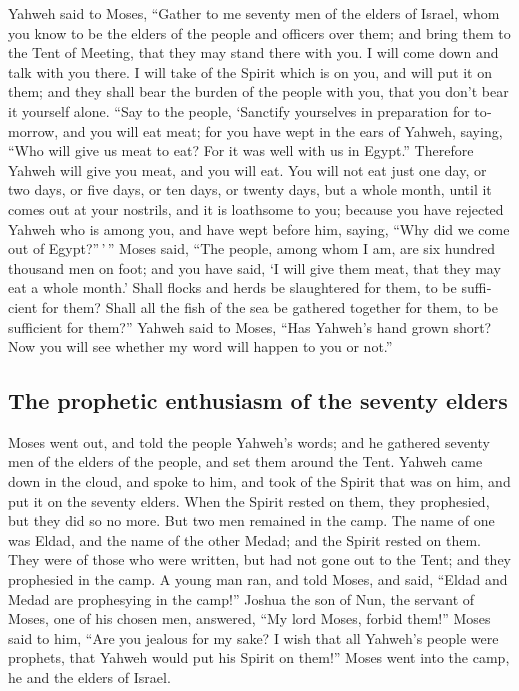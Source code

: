 \begin{paracol}{2}
\begin{otherlanguage}{english}
 Yahweh said to Moses, ``Gather to me seventy men of the
elders of Israel, whom you know to be the elders of the people and
officers over them; and bring them to the Tent of Meeting, that they may
stand there with you.  I will come down and talk with you
there. I will take of the Spirit which is on you, and will put it on
them; and they shall bear the burden of the people with you, that you
don't bear it yourself alone.  ``Say to the people,
`Sanctify yourselves in preparation for tomorrow, and you will eat meat;
for you have wept in the ears of Yahweh, saying, ``Who will give us meat
to eat? For it was well with us in Egypt.'' Therefore Yahweh will give
you meat, and you will eat.  You will not eat just one
day, or two days, or five days, or ten days, or twenty days,
 but a whole month, until it comes out at your nostrils,
and it is loathsome to you; because you have rejected Yahweh who is
among you, and have wept before him, saying, ``Why did we come out of
Egypt?''\,'\,''  Moses said, ``The people, among whom I
am, are six hundred thousand men on foot; and you have said, `I will
give them meat, that they may eat a whole month.'  Shall
flocks and herds be slaughtered for them, to be sufficient for them?
Shall all the fish of the sea be gathered together for them, to be
sufficient for them?''  Yahweh said to Moses, ``Has
Yahweh's hand grown short? Now you will see whether my word will happen
to you or not.''

\hypertarget{the-prophetic-enthusiasm-of-the-seventy-elders}{%
\subsection{The prophetic enthusiasm of the seventy
elders}\label{the-prophetic-enthusiasm-of-the-seventy-elders}}

 Moses went out, and told the people Yahweh's words; and
he gathered seventy men of the elders of the people, and set them around
the Tent.  Yahweh came down in the cloud, and spoke to
him, and took of the Spirit that was on him, and put it on the seventy
elders. When the Spirit rested on them, they prophesied, but they did so
no more.  But two men remained in the camp. The name of
one was Eldad, and the name of the other Medad; and the Spirit rested on
them. They were of those who were written, but had not gone out to the
Tent; and they prophesied in the camp.  A young man ran,
and told Moses, and said, ``Eldad and Medad are prophesying in the
camp!''  Joshua the son of Nun, the servant of Moses, one
of his chosen men, answered, ``My lord Moses, forbid them!''
 Moses said to him, ``Are you jealous for my sake? I wish
that all Yahweh's people were prophets, that Yahweh would put his Spirit
on them!''  Moses went into the camp, he and the elders
of Israel.


\end{otherlanguage}
\end{paracol}

